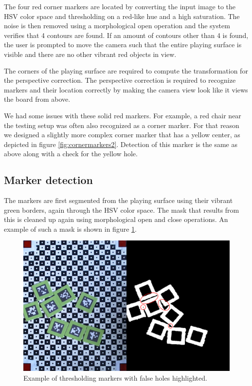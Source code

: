             The four red corner markers are located by converting the input
            image to the HSV color space and thresholding on a red-like hue and
            a high saturation. The noise is then removed using a morphological
            open operation and the system verifies that 4 contours are found. If
            an amount of contours other than 4 is found, the user is prompted to
            move the camera such that the entire playing surface is visible and
            there are no other vibrant red objects in view.

            The corners of the playing surface are required to compute the
            transformation for the perspective correction. The perspective
            correction is required to recognize markers and their location
            correctly by making the camera view look like it views the board
            from above.

            We had some issues with these solid red markers. For example, a red
            chair near the testing setup was often also recognized as a corner
            marker. For that reason we designed a slightly more complex corner
            marker that has a yellow center, as depicted in figure
            \ref{fig:cornermarkers2}. Detection of this marker is the same as
            above along with a check for the yellow hole.

        \subsection{Marker detection}
            The markers are first segmented from the playing surface using their
            vibrant green borders, again through the HSV color space. The mask
            that results from this is cleaned up again using morphological open
            and close operations. An example of such a mask is shown in
            figure \ref{fig:markerthresholding}.

            \begin{figure}[!ht]
                \centering
                \includegraphics[width=\textwidth]{MarkerThresholding}
                \caption{Example of thresholding markers with false holes highlighted.}
                \label{fig:markerthresholding}
            \end{figure}

